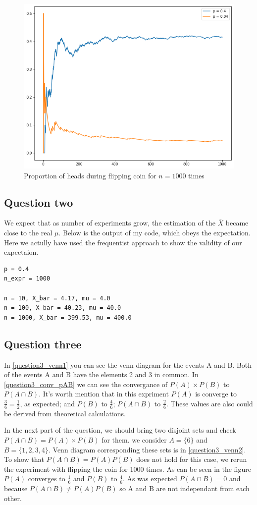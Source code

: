 \documentclass[12pt, a4paper]{book}
\begin{document}
\begin{figure}
    \centering
    \includegraphics[width=0.5\linewidth]{images/question1/output.png}
    \caption{Proportion of heads during flipping coin for $n=1000$ times}
    \label{question1}
\end{figure}

\subsection*{Question two}

We expect that as number of experiments grow, the estimation of the $\bar{X}$ became close to the real $\mu$.
Below is the output of my code, which obeys the expectation. Here we actully have used the frequentist approach to
show the validity of our expectaion.

\begin{mdframed}
\begin{verbatim}
p = 0.4
n_expr = 1000

n = 10, X_bar = 4.17, mu = 4.0
n = 100, X_bar = 40.23, mu = 40.0
n = 1000, X_bar = 399.53, mu = 400.0
\end{verbatim}
\end{mdframed}

\subsection*{Question three}

In \autoref{question3_venn1} you can see the venn diagram for the events A and B. Both of the events A and B have
the elements 2 and 3 in common. In \autoref{question3_conv_pAB} we can see the convergance of $P(A) \times P(B)$ to $P(A \cap B)$.
It's worth mention that in this expriment $P(A)$ is converge to $\frac{3}{6}=\frac{1}{2}$, as expected; and
$P(B)$ to $\frac{4}{6}$; $P(A \cap B)$ to $\frac{2}{6}$. These values are also could be derived from theoretical calculations.

In the next part of the question, we should bring two disjoint sets and check $P(A\cap B) = P(A) \times P(B)$ for them.
we consider $A=\{6\}$ and $B=\{1,2,3,4\}$. Venn diagram corresponding these sets is in \autoref{question3_venn2}.
To show that $P(A \cap B) = P(A) P(B)$ does not hold for this case, we rerun the experiment with flipping the
coin for 1000 times. As can be seen in the figure $P(A)$ converges to $\frac{1}{6}$ and $P(B)$ to $\frac{4}{6}$.
As was expected $P(A \cap B) = 0$ and because $P(A \cap B) \neq  P(A) P(B)$ so A and B are not independant from
each other.
\end{document}
